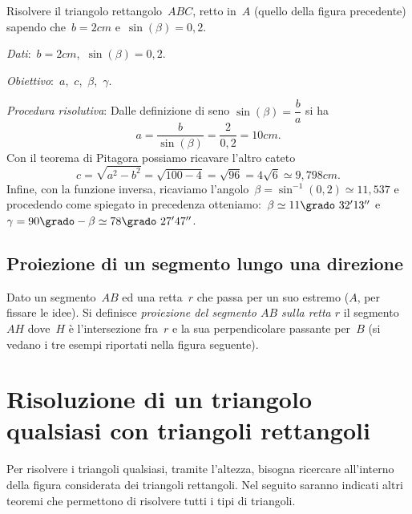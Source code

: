 \begin{exrig}
 \begin{esempio}
Risolvere il triangolo rettangolo~$ABC$, retto in~$A$ (quello della figura precedente) sapendo che~$b=2\unit{cm}$ e~$\sin(\beta)=0,2$.

\emph{Dati}:~$b=2\unit{cm}$,\quad~$\sin(\beta)=0,2$.

\emph{Obiettivo}:~$a$,\quad~$c$,\quad~${\beta}$,\quad~${\gamma}$.

\emph{Procedura risolutiva}:
Dalle definizione di seno $\sin(\beta)=\dfrac{b}{a}$ si ha
\[a=\frac{b}{\sin(\beta)}=\frac{2}{0,2}=10\unit{cm}.\]
Con il teorema di Pitagora possiamo ricavare l'altro cateto
\[c=\sqrt{a^{2}-b^{2}}=\sqrt{100-4}=\sqrt{96}=4\sqrt{6}\simeq 9,798\unit{cm}.\]
Infine, con la funzione inversa, ricaviamo l'angolo~${\beta}=\sin^{-1}(0,2)\simeq 11,537$ e procedendo come spiegato in
precedenza otteniamo:~${\beta}\simeq 11\grado~32' 13''$ e~${\gamma}=90\grado-\beta\simeq 78\grado~27'47''$.
 \end{esempio}
\end{exrig}

\ovalbox{\risolvii \ref{ese:C.7}, \ref{ese:C.8}, \ref{ese:C.9}, \ref{ese:C.10}}

\subsection{Proiezione di un segmento lungo una direzione}

\begin{definizione}
Dato un segmento~$AB$ ed una retta~$r$ che passa per un suo estremo ($A$, per fissare le idee). Si definisce
\emph{proiezione del segmento $AB$ sulla retta $r$} il segmento~$AH$ dove~$H$ è l'intersezione fra~$r$ e la
sua perpendicolare passante per~$B$ (si vedano i tre esempi riportati nella figura seguente).
\end{definizione}

\begin{center}
 
\end{center}

\ovalbox{\risolvii \ref{ese:C.11}, \ref{ese:C.12}, \ref{ese:C.13}, \ref{ese:C.14}, \ref{ese:C.15}, \ref{ese:C.16}, \ref{ese:C.17}, \ref{ese:C.18},
\ref{ese:C.19}, \ref{ese:C.20}, \ref{ese:C.21}}

\section{Risoluzione di un triangolo qualsiasi con triangoli rettangoli}
Per risolvere i triangoli qualsiasi, tramite l'altezza, bisogna ricercare all'interno della figura considerata dei triangoli rettangoli.
Nel seguito saranno indicati altri teoremi che permettono
di risolvere tutti i tipi di triangoli.

